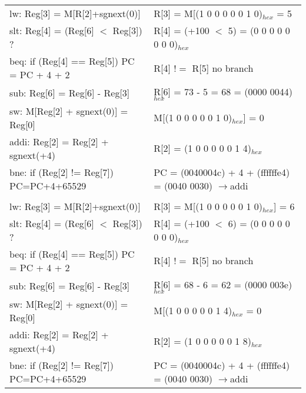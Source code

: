 \documentclass[11pt]{article}   	%
\begin{document}
\newpage

\begin{table}[!htbp]
\begin{tabular}{ll}

lw: Reg[3] = M[R[2]+sgnext(0)]&  R[3] = M[(1 0 0 0 0 0 1 0)$_{hex}$ = 5 \\

slt: Reg[4] = (Reg[6] $<$ Reg[3]) ?& R[4] = (+100 $<$ 5) = (0 0 0 0 0 0 0 0)$_{hex}$\\

beq: if (Reg[4] == Reg[5]) PC = PC + 4 + 2& R[4] $!=$ R[5]  no branch\\

sub: Reg[6] = Reg[6] - Reg[3]& R[6] = 73 - 5 = 68 = (0000 0044)$_{hex}$\\

sw: M[Reg[2] + sgnext(0)] = Reg[0]& M[(1 0 0 0 0 0 1 0)$_{hex}$] = 0\\

addi: Reg[2] = Reg[2] + sgnext(+4) & R[2] = (1 0 0 0 0 0 1 4)$_{hex}$\\

bne: if (Reg[2] != Reg[7]) PC=PC+4+65529 & PC = (0040004c) + 4 + (ffffffe4) = (0040 0030)  $\rightarrow$addi\\

&\\


lw: Reg[3] = M[R[2]+sgnext(0)]&  R[3] = M[(1 0 0 0 0 0 1 0)$_{hex}$] = 6 \\

slt: Reg[4] = (Reg[6] $<$ Reg[3]) ?& R[4] = (+100 $<$ 6) = (0 0 0 0 0 0 0 0)$_{hex}$\\

beq: if (Reg[4] == Reg[5]) PC = PC + 4 + 2& R[4] $!=$ R[5]  no branch\\

sub: Reg[6] = Reg[6] - Reg[3]& R[6] = 68 - 6 = 62 = (0000 003e)$_{hex}$\\

sw: M[Reg[2] + sgnext(0)] = Reg[0]& M[(1 0 0 0 0 0 1 4)$_{hex}$ = 0\\

addi: Reg[2] = Reg[2] + sgnext(+4) & R[2] = (1 0 0 0 0 0 1 8)$_{hex}$\\

bne: if (Reg[2] != Reg[7]) PC=PC+4+65529 & PC = (0040004c) + 4 + (ffffffe4) = (0040 0030)  $\rightarrow$addi\\


\end{tabular}
\end{table}
\end{document}

